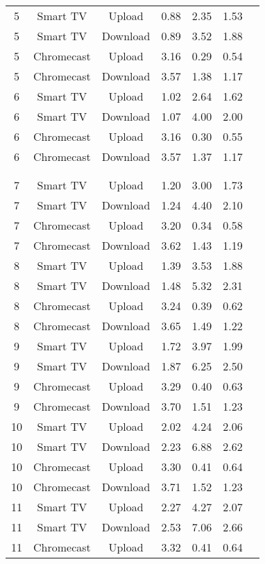 \begin{longtable}{|c|c|c|c|c|c|c|}
    \hline
    5 & Smart TV & Upload & 0.88 & 2.35 & 1.53 \\
    5 & Smart TV & Download & 0.89 & 3.52 & 1.88 \\
    5 & Chromecast & Upload & 3.16 & 0.29 & 0.54 \\
    5 & Chromecast & Download & 3.57 & 1.38 & 1.17 \\
    \hline
    6 & Smart TV & Upload & 1.02 & 2.64 & 1.62 \\
    6 & Smart TV & Download & 1.07 & 4.00 & 2.00 \\
    6 & Chromecast & Upload & 3.16 & 0.30 & 0.55 \\
    6 & Chromecast & Download & 3.57 & 1.37 & 1.17 \\
    &&&&& \\
    &&&&& \\
    \hline
    7 & Smart TV & Upload & 1.20 & 3.00 & 1.73 \\
    7 & Smart TV & Download & 1.24 & 4.40 & 2.10 \\
    7 & Chromecast & Upload & 3.20 & 0.34 & 0.58 \\
    7 & Chromecast & Download & 3.62 & 1.43 & 1.19 \\
    \hline
    8 & Smart TV & Upload & 1.39 & 3.53 & 1.88 \\
    8 & Smart TV & Download & 1.48 & 5.32 & 2.31 \\
    8 & Chromecast & Upload & 3.24 & 0.39 & 0.62 \\
    8 & Chromecast & Download & 3.65 & 1.49 & 1.22 \\
    \hline
    9 & Smart TV & Upload & 1.72 & 3.97 & 1.99 \\
    9 & Smart TV & Download & 1.87 & 6.25 & 2.50 \\
    9 & Chromecast & Upload & 3.29 & 0.40 & 0.63 \\
    9 & Chromecast & Download & 3.70 & 1.51 & 1.23 \\
    \hline
    10 & Smart TV & Upload & 2.02 & 4.24 & 2.06 \\
    10 & Smart TV & Download & 2.23 & 6.88 & 2.62 \\
    10 & Chromecast & Upload & 3.30 & 0.41 & 0.64 \\
    10 & Chromecast & Download & 3.71 & 1.52 & 1.23 \\
    \hline
    11 & Smart TV & Upload & 2.27 & 4.27 & 2.07 \\
    11 & Smart TV & Download & 2.53 & 7.06 & 2.66 \\
    11 & Chromecast & Upload & 3.32 & 0.41 & 0.64 \\

\end{longtable}
